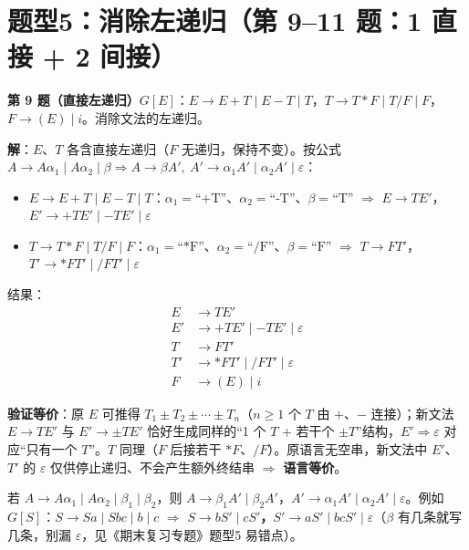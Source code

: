 \documentclass[12pt,a4paper,fontset=windows]{ctexart}
\newcommand{\imp}{\ensuremath{\Rightarrow}}
\begin{document}
\section{\texorpdfstring{题型5：消除左递归（第 9--11 题：1 直接 + 2 间接）}{题型5：消除左递归（第 9–11 题：1 直接 + 2 间接）}}

\begin{qbox}
{\large\bfseries 第 9 题（直接左递归）}\quad $G[E]$：$E \to E{+}T \mid E{-}T \mid T$，$T \to T{*}F \mid T/F \mid F$，$F \to (E) \mid i$。消除文法的左递归。
\end{qbox}

\textbf{解}：$E$、$T$ 各含直接左递归（$F$ 无递归，保持不变）。按公式 $A \to A\alpha_1 \mid A\alpha_2 \mid \beta \Rightarrow A \to \beta A',\ A' \to \alpha_1 A' \mid \alpha_2 A' \mid \varepsilon$：
\begin{itemize}
\item $E \to E{+}T \mid E{-}T \mid T$：$\alpha_1=\text{“+T”}$、$\alpha_2=\text{“-T”}$、$\beta=\text{“T”}$ \imp{} $E \to TE'$，$E' \to {+}TE' \mid {-}TE' \mid \varepsilon$
\item $T \to T{*}F \mid T/F \mid F$：$\alpha_1=\text{“*F”}$、$\alpha_2=\text{“/F”}$、$\beta=\text{“F”}$ \imp{} $T \to FT'$，$T' \to {*}FT' \mid /FT' \mid \varepsilon$
\end{itemize}
结果：
\[
\begin{aligned}
E  &\to T E'\\
E' &\to + T E' \mid - T E' \mid \varepsilon\\
T  &\to F T'\\
T' &\to * F T' \mid / F T' \mid \varepsilon\\
F  &\to ( E ) \mid i
\end{aligned}
\]

\textbf{验证等价}：原 $E$ 可推得 $T_1 \pm T_2 \pm \cdots \pm T_n$（$n \ge 1$ 个 $T$ 由 $+$、$-$ 连接）；新文法 $E \to TE'$ 与 $E' \to \pm TE'$ 恰好生成同样的``1 个 $T$ + 若干个 $\pm T$''结构，$E' \Rightarrow \varepsilon$ 对应``只有一个 $T$''。$T$ 同理（$F$ 后接若干 ${*}F$、$/F$）。原语言无空串，新文法中 $E'$、$T'$ 的 $\varepsilon$ 仅供停止递归、不会产生额外终结串 \imp{} \textbf{语言等价}。

\begin{tipbox}
若 $A \to A\alpha_1 \mid A\alpha_2 \mid \beta_1 \mid \beta_2$，则 $A \to \beta_1 A' \mid \beta_2 A'$，$A' \to \alpha_1 A' \mid \alpha_2 A' \mid \varepsilon$。例如 $G[S]$：$S \to Sa \mid Sbc \mid b \mid c$ \imp{} \textbf{$S \to bS' \mid cS'$，$S' \to aS' \mid bcS' \mid \varepsilon$}（$\beta$ 有几条就写几条，别漏 $\varepsilon$，见《期末复习专题》题型5 易错点）。
\end{tipbox}
\end{document}
